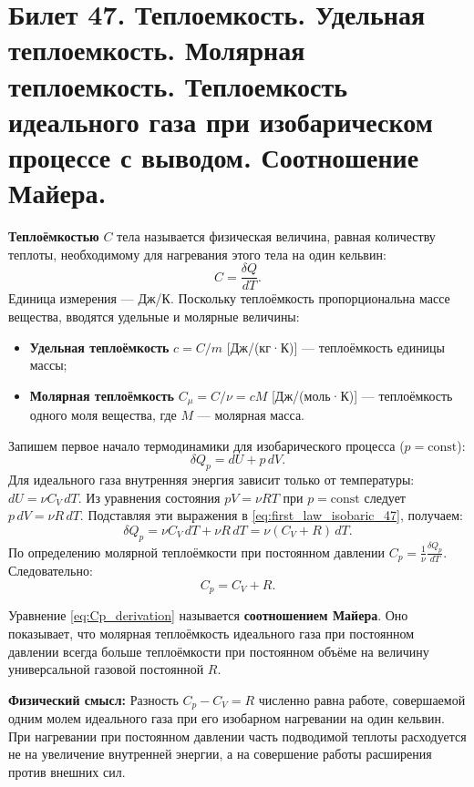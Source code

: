 \section{Билет 47. Теплоемкость. Удельная теплоемкость. Молярная теплоемкость. Теплоемкость идеального газа при изобарическом процессе с выводом. Соотношение Майера.}

\begin{definition}
\textbf{Теплоёмкостью} $C$ тела называется физическая величина, равная количеству теплоты, необходимому для нагревания этого тела на один кельвин:
\begin{equation}
    C = \frac{\delta Q}{dT}. \label{eq:heat_cap_def_47}
\end{equation}
Единица измерения --- Дж/К. Поскольку теплоёмкость пропорциональна массе вещества, вводятся удельные и молярные величины:
\begin{itemize}
    \item \textbf{Удельная теплоёмкость} $c = C/m$ [Дж/(кг·К)] --- теплоёмкость единицы массы;
    \item \textbf{Молярная теплоёмкость} $C_\mu = C/\nu = c M$ [Дж/(моль·К)] --- теплоёмкость одного моля вещества, где $M$ --- молярная масса.
\end{itemize}
\end{definition}

\begin{theorem}
Запишем первое начало термодинамики для изобарического процесса ($p = \text{const}$):
\begin{equation}
    \delta Q_p = dU + p \, dV. \label{eq:first_law_isobaric_47}
\end{equation}
Для идеального газа внутренняя энергия зависит только от температуры: $dU = \nu C_V \, dT$. Из уравнения состояния $pV = \nu RT$ при $p = \text{const}$ следует $p \, dV = \nu R \, dT$. Подставляя эти выражения в \eqref{eq:first_law_isobaric_47}, получаем:
\begin{equation}
    \delta Q_p = \nu C_V \, dT + \nu R \, dT = \nu (C_V + R) \, dT.
\end{equation}
По определению молярной теплоёмкости при постоянном давлении $C_p = \frac{1}{\nu} \frac{\delta Q_p}{dT}$. Следовательно:
\begin{equation}
    C_p = C_V + R. \label{eq:Cp_derivation}
\end{equation}
\end{theorem}

\begin{property}
Уравнение \eqref{eq:Cp_derivation} называется \textbf{соотношением Майера}. Оно показывает, что молярная теплоёмкость идеального газа при постоянном давлении всегда больше теплоёмкости при постоянном объёме на величину универсальной газовой постоянной $R$.
\par\noindent\textbf{Физический смысл:} Разность $C_p - C_V = R$ численно равна работе, совершаемой одним молем идеального газа при его изобарном нагревании на один кельвин. При нагревании при постоянном давлении часть подводимой теплоты расходуется не на увеличение внутренней энергии, а на совершение работы расширения против внешних сил.
\end{property}


